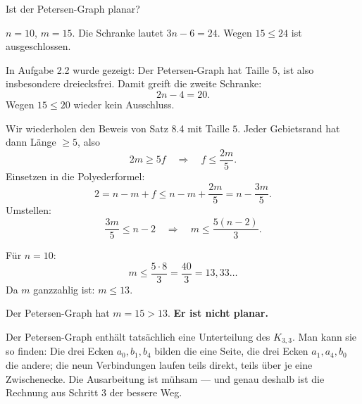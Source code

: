 \begin{aufgabe}
Ist der Petersen-Graph planar?

\loesung
{}
$n = 10$, $m = 15$. Die Schranke lautet $3n-6 = 24$. Wegen $15 \le 24$ ist  ausgeschlossen.

In Aufgabe 2.2 wurde gezeigt: Der Petersen-Graph hat Taille $5$, ist also insbesondere dreiecksfrei. Damit greift die zweite Schranke:
\[ 2n - 4 = 20 . \]
Wegen $15 \le 20$ wieder kein Ausschluss.

Wir wiederholen den Beweis von Satz 8.4 mit Taille $5$. Jeder Gebietsrand hat dann Länge $\ge 5$, also
\[ 2m \ge 5f \quad\Longrightarrow\quad f \le \frac{2m}{5} . \]
Einsetzen in die Polyederformel:
\[ 2 = n - m + f \le n - m + \frac{2m}{5} = n - \frac{3m}{5} . \]
Umstellen:
\[ \frac{3m}{5} \le n-2 \quad\Longrightarrow\quad m \le \frac{5(n-2)}{3} . \]

Für $n = 10$:
\[ m \le \frac{5 \cdot 8}{3} = \frac{40}{3} = 13{,}33\ldots \]
Da $m$ ganzzahlig ist: $m \le 13$.

Der Petersen-Graph hat $m = 15 > 13$. \textbf{Er ist nicht planar.}

Der Petersen-Graph enthält tatsächlich eine Unterteilung des $K_{3,3}$. Man kann sie so finden: Die drei Ecken $a_0, b_1, b_4$ bilden die eine Seite, die drei Ecken $a_1, a_4, b_0$ die andere; die neun Verbindungen laufen teils direkt, teils über je eine Zwischenecke. Die Ausarbeitung ist mühsam --- und genau deshalb ist die Rechnung aus Schritt 3 der bessere Weg.

\begin{center}
\begin{minipage}{0.86\textwidth}
\end{minipage}
\end{center}
\end{aufgabe}

